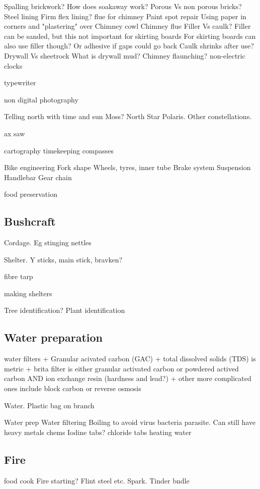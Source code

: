Spalling brickwork?
How does soakaway work?
Porous Vs non porous bricks?
Steel lining
Firm flex lining?
flue for chimney
Paint spot repair
Using paper in corners and "plastering" over
Chimney cowl
Chimney flue
Filler Vs caulk? Filler can be sanded, but this not important for skirting boards
For skirting boards can also use filler though? Or adhesive if gaps could go back
Caulk shrinks after use?
Drywall Vs sheetrock
What is drywall mud?
Chimney flaunching?
non-electric clocks

typewriter

non digital photography

Telling north with time and sun
Moss?
North Star Polaris. Other constellations.

ax
saw

cartography
timekeeping
compasses

Bike engineering
Fork shape
Wheels, tyres, inner tube
Brake system
Suspension
Handlebar
Gear chain

food preservation
\subsection{Bushcraft}

Cordage. Eg stinging nettles

Shelter. Y sticks, main stick, bravken?

fibre tarp

making shelters

Tree identification?
Plant identification

\subsection{Water preparation}
water filters
+ Granular acivated carbon (GAC)
+ total dissolved solids (TDS) is metric
+ brita filter is either granular activated carbon or powdered actived carbon AND ion exchange resin (hardness and lead?)
+ other more complicated ones include block carbon or reverse osmosis

Water. Plastic bag on branch

Water prep
Water filtering
Boiling to avoid virus bacteria parasite.
Can still have heavy metals chems
Iodine tabs? chloride tabs
heating water

\subsection{Fire}
food cook
Fire starting? Flint steel etc.
Spark. Tinder bndle

